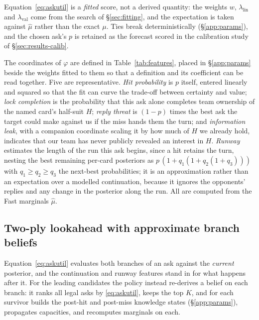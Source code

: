Equation~\eqref{eq:askutil} is a \emph{fitted} score, not a derived quantity:
the weights $w$, $\lambda_{\mathrm{lin}}$ and $\lambda_{\mathrm{val}}$ come
from the search of \S\ref{sec:fitting}, and the expectation is taken against
$\hat\mu$ rather than the exact $\mu$. Ties break deterministically
(\S\ref{app:params}), and the chosen ask's $p$ is retained as the forecast
scored in the calibration study of \S\ref{sec:results-calib}.

The \numAskFeats{} coordinates of $\varphi$ are defined in
Table~\ref{tab:features}, placed in \S\ref{app:params} beside the weights
fitted to them so that a definition and its coefficient can be read together.
Five are representative. \emph{Hit probability} is $p$ itself, entered
linearly and squared so that the fit can curve the trade-off between certainty
and value; \emph{lock completion} is the probability that this ask alone
completes team ownership of the named card's half-suit $H$; \emph{reply
threat} is $(1-p)$ times the best ask the target could make against us if the
miss hands them the turn; and \emph{information leak}, with a companion
coordinate scaling it by how much of $H$ we already hold, indicates that our
team has never publicly revealed an interest in $H$. \emph{Runway} estimates
the length of the run this ask begins, since a hit retains the turn, nesting
the best remaining per-card posteriors as $p\,(1 + q_1(1 + q_2(1 + q_3)))$
with $q_1 \ge q_2 \ge q_3$ the next-best probabilities; it is an approximation
rather than an expectation over a modelled continuation, because it ignores
the opponents' replies and any change in the posterior along the run. All are
computed from the Fast marginals $\hat\mu$.

\subsection{Two-ply lookahead with approximate branch beliefs}
\label{sec:twoply}

Equation~\eqref{eq:askutil} evaluates both branches of an ask against the
\emph{current} posterior, and the continuation and runway features stand in
for what happens after it. For the leading candidates the policy instead
re-derives a belief on each branch: it ranks all legal asks by
\eqref{eq:askutil}, keeps the top $K$, and for each survivor builds the
post-hit and post-miss knowledge states (\S\ref{app:params}), propagates
capacities, and recomputes marginals on each.

